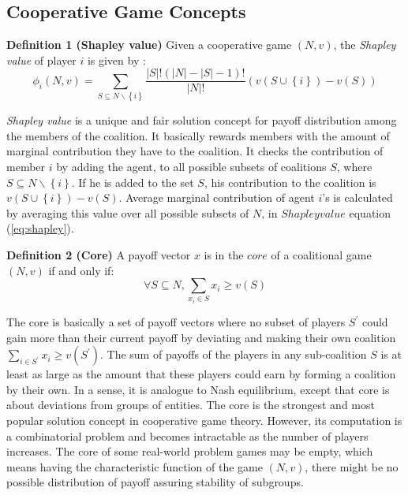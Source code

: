         \subsection{Cooperative Game Concepts}

            {\bf Definition 1 (Shapley value)} Given a cooperative game $(N,
            v)$, the \emph{Shapley value} of player $i$ is given by \cite{shapley_value}:
            \begin{equation}\label{eq:shapley}
            \phi_i(N,v) = \sum_{S \subseteq N \backslash \left\{i\right\} }
            \frac{|S|! (|N|-|S|-1)!}{|N|!} (v(S \cup \left\{i\right\}) - v(S))
            \end{equation}

            \emph{Shapley value} is a unique and fair solution concept for
            payoff distribution among the members of the coalition. It
            basically rewards members with the amount of marginal contribution
            they have to the coalition.  It checks the contribution of member $i$ by adding the agent, to all possible subsets
            of coalitions $S$, where $S \subseteq N\backslash\left\{i\right\}$. If he is added to the set $S$, his
            contribution to the coalition is $v(S \cup \left\{i\right\}) - v(S)$. Average marginal contribution of agent $i$'s
            is calculated by averaging this value over all possible subsets of $N$, in $Shapley value$ equation (\ref{eq:shapley}).


            {\bf Definition 2 (Core)} A payoff vector $x$ is in the $core$ of
            a coalitional game $(N, v)$ if and only if:
            \begin{equation}\label{eq:core}
            \forall S \subseteq N, \sum_{x_i \in S} x_i \geq v(S)
            \end{equation}

            The core is basically a set of payoff vectors where no subset of
            players $S^\prime$ could gain more than their current payoff by
            deviating and making their own coalition $\sum_{i \in S^\prime}
            x_i \geq v(S^\prime)$. The sum of payoffs of the players in any
            sub-coalition $S$ is at least as large as the amount that these
            players could earn by forming a coalition by their own. In a
            sense, it is analogue to Nash equilibrium, except that core is
            about deviations from groups of entities. The core is the
            strongest and most popular solution concept in cooperative game
            theory. However, its computation is a combinatorial problem and
            becomes intractable as the number of players increases. The core
            of some real-world problem games may be empty, which means having
            the characteristic function of the game $(N,v)$, there might be no
            possible distribution of payoff assuring stability of subgroups.

